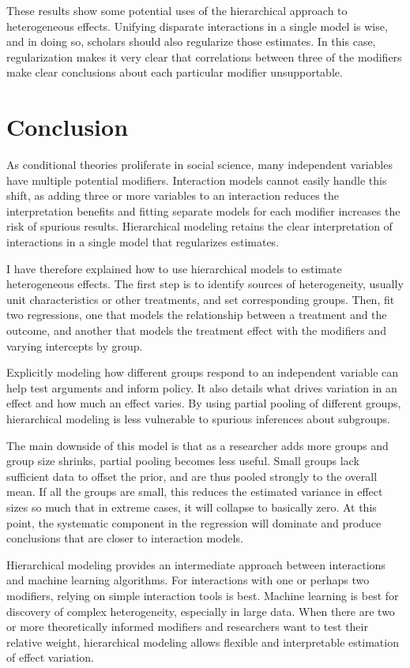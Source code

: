 \documentclass[12pt]{article}
\begin{document}
These results show some potential uses of the hierarchical approach to heterogeneous effects.
Unifying disparate interactions in a single model is wise, and in doing so, scholars should also regularize those estimates.
In this case, regularization makes it very clear that correlations between three of the modifiers make clear conclusions about each particular modifier unsupportable.


\section{Conclusion}


As conditional theories proliferate in social science, many independent variables have multiple potential modifiers. 
Interaction models cannot easily handle this shift, as adding three or more variables to an interaction reduces the interpretation benefits and fitting separate models for each modifier increases the risk of spurious results. 
Hierarchical modeling retains the clear interpretation of interactions in a single model that regularizes estimates. 


I have therefore explained how to use hierarchical models to estimate heterogeneous effects. 
The first step is to identify sources of heterogeneity, usually unit characteristics or other treatments, and set corresponding groups.
Then, fit two regressions, one that models the relationship between a treatment and the outcome, and another that models the treatment effect with the modifiers and varying intercepts by group.


Explicitly modeling how different groups respond to an independent variable can help test arguments and inform policy.  
It also details what drives variation in an effect and how much an effect varies. 
By using partial pooling of different groups, hierarchical modeling is less vulnerable to spurious inferences about subgroups.
 

The main downside of this model is that as a researcher adds more groups and group size shrinks, partial pooling becomes less useful. 
Small groups lack sufficient data to offset the prior, and are thus pooled strongly to the overall mean. 
If all the groups are small, this reduces the estimated variance in effect sizes so much that in extreme cases, it will collapse to basically zero.
At this point, the systematic component in the regression will dominate and produce conclusions that are closer to interaction models.
 

Hierarchical modeling provides an intermediate approach between interactions and machine learning algorithms. 
For interactions with one or perhaps two modifiers, relying on simple interaction tools is best. 
Machine learning is best for discovery of complex heterogeneity, especially in large data. 
When there are two or more theoretically informed modifiers and researchers want to test their relative weight, hierarchical modeling allows flexible and interpretable estimation of effect variation. 
\end{document}
